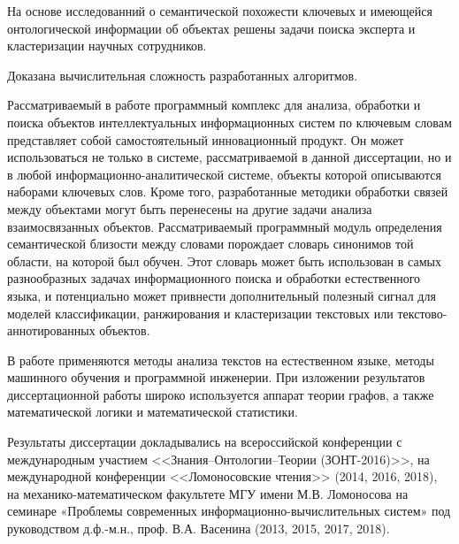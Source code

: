 На основе исследованний о семантической похожести ключевых и имеющейся онтологической информации об объектах решены задачи поиска эксперта и кластеризации научных сотрудников.

Доказана вычислительная сложность разработанных алгоритмов.

{\influence} Рассматриваемый в работе программный комплекс для анализа, обработки и поиска объектов интеллектуальных информационных систем по ключевым словам представляет собой самостоятельный инновационный продукт. Он может использоваться не только в системе, рассматриваемой в данной диссертации, но и в любой информационно-аналитической системе, объекты которой описываются наборами ключевых слов. Кроме того, разработанные методики обработки связей между объектами могут быть перенесены на другие задачи анализа взаимосвязанных объектов. Рассматриваемый программный модуль определения семантической близости между словами  порождает словарь синонимов той области, на которой был обучен. Этот словарь может быть использован в самых разнообразных задачах информационного поиска и обработки естественного языка, и потенциально может привнести дополнительный полезный сигнал для моделей классификации, ранжирования и кластеризации текстовых или текстово-аннотированных объектов.

{\methods} В работе применяются методы анализа текстов на естественном языке, методы машинного обучения и программной инженерии. При изложении результатов диссертационной работы широко используется аппарат теории графов, а также математической логики и математической статистики.

{\probation} Результаты диссертации докладывались на всероссийской конференции с международным участием <<Знания–Онтологии–Теории (ЗОНТ-2016)>>, на международной конференции <<Ломоносовские чтения>> (2014, 2016, 2018),  на механико-математическом факультете МГУ имени М.В. Ломоносова на семинаре «Проблемы современных информационно-вычислительных систем» под руководством д.ф.-м.н., проф. В.А. Васенина (2013, 2015, 2017, 2018).


